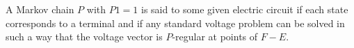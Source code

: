 A Markov chain $P$ with $P1 = 1$ is said to  some given electric circuit if each state corresponds to a terminal and if any standard voltage problem can be solved in such a way that the voltage vector is $P$-regular at points of $F - E$.
